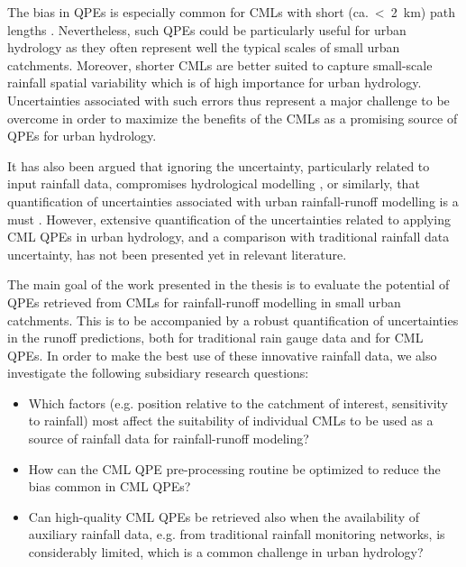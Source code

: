 \documentclass{ctuthesis}\usepackage[]{graphicx}\usepackage[]{color}
\begin{document}
\enlargethispage{\baselineskip}

The bias in QPEs is especially common for CMLs with short (ca.~<~2~km) path lengths  \citep{leijnseMicrowaveLinkRainfall2008}. Nevertheless, such QPEs could be particularly useful for urban hydrology as they often represent well the typical scales of small urban catchments. Moreover, shorter CMLs are better suited to capture small-scale rainfall spatial variability which is of high importance for urban hydrology. Uncertainties associated with such errors thus represent a major challenge to be overcome in order to maximize the benefits of the CMLs as a promising source of QPEs for urban hydrology.

It has also been argued that ignoring the uncertainty, particularly related to input rainfall data, compromises  hydrological modelling \citep{beven2006undermining, kavetskiBayesianAnalysisInput2006}, or similarly, that quantification of uncertainties associated with urban rainfall-runoff modelling is a must \citep{dotto2012comparison}. However, extensive quantification of the uncertainties related to applying CML QPEs in urban hydrology, and a comparison with traditional rainfall data uncertainty, has not been presented yet in relevant literature.

The main goal of the work presented in the thesis is to evaluate the potential of QPEs retrieved from CMLs for rainfall-runoff modelling in small urban catchments. This is to be accompanied by a robust quantification of uncertainties in the runoff predictions, both for traditional rain gauge data and for CML QPEs. In order to make the best use of these innovative rainfall data, we also investigate the following subsidiary research questions:
\begin{itemize}
        \item Which factors (e.g. position relative to the catchment of interest, sensitivity to rainfall) most affect the suitability of individual CMLs to be used as a source of rainfall data for rainfall-runoff modeling? 
        \item How can the CML QPE pre-processing routine be optimized to reduce the bias common in CML QPEs?
        \item Can high-quality CML QPEs be retrieved also when the availability of auxiliary rainfall data, e.g. from traditional rainfall monitoring networks, is considerably limited, which is a common challenge in urban hydrology?
\end{itemize}
\end{document}
